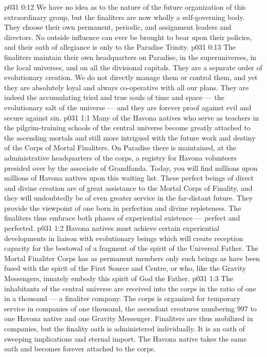 \vs p031 0:12 We have no idea as to the nature of the future organization of this extraordinary group, but the finaliters are now wholly a self\hyp{}governing body. They choose their own permanent, periodic, and assignment leaders and directors. No outside influence can ever be brought to bear upon their policies, and their oath of allegiance is only to the Paradise Trinity.
\vs p031 0:13 The finaliters maintain their own headquarters on Paradise, in the superuniverses, in the local universes, and on all the divisional capitals. They are a separate order of evolutionary creation. We do not directly manage them or control them, and yet they are absolutely loyal and always co\hyp{}operative with all our plans. They are indeed the accumulating tried and true souls of time and space --- the evolutionary salt of the universe --- and they are forever proof against evil and secure against sin.
\vs p031 1:1 Many of the Havona natives who serve as teachers in the pilgrim\hyp{}training schools of the central universe become greatly attached to the ascending mortals and still more intrigued with the future work and destiny of the Corps of Mortal Finaliters. On Paradise there is maintained, at the administrative headquarters of the corps, a registry for Havona volunteers presided over by the associate of Grandfanda. Today, you will find millions upon millions of Havona natives upon this waiting list. These perfect beings of direct and divine creation are of great assistance to the Mortal Corps of Finality, and they will undoubtedly be of even greater service in the far\hyp{}distant future. They provide the viewpoint of one born in perfection and divine repleteness. The finaliters thus embrace both phases of experiential existence --- perfect and perfected.
\vs p031 1:2 Havona natives must achieve certain experiential developments in liaison with evolutionary beings which will create reception capacity for the bestowal of a fragment of the spirit of the Universal Father. The Mortal Finaliter Corps has as permanent members only such beings as have been fused with the spirit of the First Source and Centre, or who, like the Gravity Messengers, innately embody this spirit of God the Father.
\vs p031 1:3 The inhabitants of the central universe are received into the corps in the ratio of one in a thousand --- a finaliter company. The corps is organized for temporary service in companies of one thousand, the ascendant creatures numbering 997 to one Havona native and one Gravity Messenger. Finaliters are thus mobilized in companies, but the finality oath is administered individually. It is an oath of sweeping implications and eternal import. The Havona native takes the same oath and becomes forever attached to the corps.
